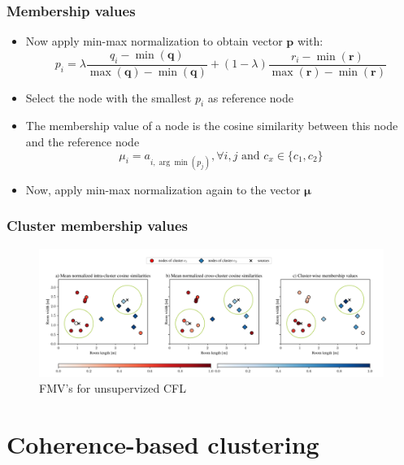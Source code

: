 \documentclass[aspectratio=169]{beamer}
\begin{document}
\begin{frame}
\frametitle{Membership values}
    
    \begin{itemize}
    \item Now apply min-max normalization to obtain vector $\pmb p$ with:
    \begin{equation}
        p_i = \lambda \frac{q_i - \min(\pmb q) }{\max(\pmb q) - \min(\pmb q)}
+ (1- \lambda) \frac{r_i - \min(\pmb r) }{\max(\pmb r) - \min(\pmb r)}
    \end{equation}
    \item Select the node with the smallest $p_i$ as reference node
    \item The membership value of a node is the cosine similarity between this node and the reference node
    \begin{equation}
        \mu_i = a_{i, \arg \min(p_j)}, \forall i,j \text{ and } c_x \in \{c_1, c_2\}
    \end{equation}
     \item Now, apply min-max normalization again to the vector $\pmb \mu$
    
    \end{itemize}
    
\end{frame}

\begin{frame}
\frametitle{Cluster membership values}
\begin{figure}
    \centering
    \includegraphics[width=.9\linewidth]{images/federated.png}
    \caption{FMV's for unsupervized CFL}
    \label{fig:federated}
\end{figure}
    
\end{frame}

\section{Coherence-based clustering}
\end{document}
